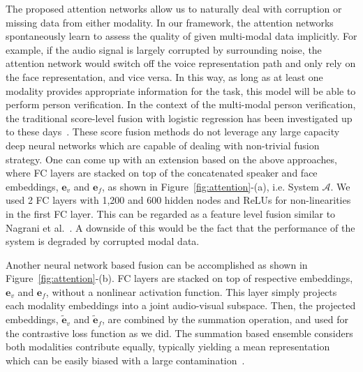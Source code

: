 \documentclass{article}
\newcommand{\ohcm}[1]{\textcolor{red}{Oh$>$ #1 --}}
\begin{document}
The proposed attention networks allow us to naturally deal with corruption or missing data from either modality.
In our framework, the attention networks spontaneously learn to assess the quality of given multi-modal data implicitly.
For example, if the audio signal is largely corrupted by surrounding noise, the attention network would switch off the voice representation path and only rely on the face representation, and vice versa.
In this way, as long as at least one modality provides appropriate information for the task, this model will be able to perform person verification. 
In the context of the multi-modal person verification, the traditional score-level fusion with logistic regression has been investigated up to these days~\cite{Choudhury1999,Luque2006,Thomas2006,hazen07,Sargin2009,Sell2018multimodal}.
These score fusion methods do not leverage any large capacity deep neural networks which are capable of dealing with non-trivial fusion strategy.
One can come up with an extension based on the above approaches, where FC layers are stacked on top of the concatenated speaker and face embeddings, $\mathbf{e}_v$ and $\mathbf{e}_f$, as shown in Figure~\ref{fig:attention}-(a), i.e. System $\mathcal{A}$. We used 2 FC layers with 1,200 and 600 hidden nodes and ReLUs for non-linearities in the first FC layer. 
This can be regarded as a feature level fusion similar to Nagrani et al.~\cite{nagrani2018seeing}.
A downside of this would be the fact that the performance of the system is degraded by corrupted modal data.

Another neural network based fusion can be accomplished as shown in Figure~\ref{fig:attention}-(b). 
FC layers are stacked on top of respective embeddings, $\mathbf{e}_v$ and $\mathbf{e}_f$, without a nonlinear activation function. 
This layer simply projects each modality embeddings into a joint audio-visual subspace.  
Then, the projected embeddings, $\widetilde{\mathbf{e}}_v$ and $\widetilde{\mathbf{e}}_f$, are combined by the summation operation, and used for the contrastive loss function as we did.
The summation based ensemble considers both modalities contribute equally, typically yielding a mean representation which can be easily biased with a large contamination~\cite{candes2011robust}.
\end{document}

